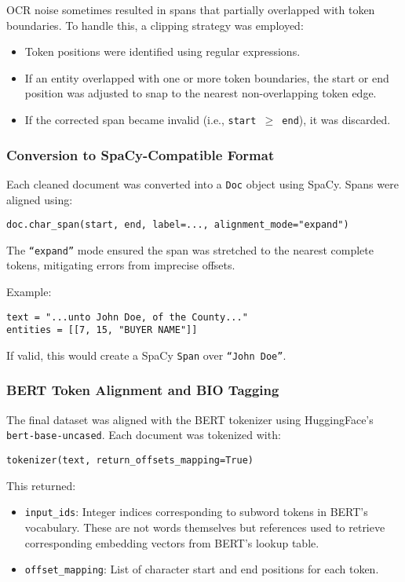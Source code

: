 \documentclass{article}
\begin{document}
OCR noise sometimes resulted in spans that partially overlapped with token boundaries. To handle this, a clipping strategy was employed:
\begin{itemize}
    \item Token positions were identified using regular expressions.
    \item If an entity overlapped with one or more token boundaries, the start or end position was adjusted to snap to the nearest non-overlapping token edge.
    \item If the corrected span became invalid (i.e., \texttt{start $\geq$ end}), it was discarded.
\end{itemize}

\subsubsection{Conversion to SpaCy-Compatible Format}

Each cleaned document was converted into a \texttt{Doc} object using SpaCy. Spans were aligned using:
\begin{verbatim}
doc.char_span(start, end, label=..., alignment_mode="expand")
\end{verbatim}

The \texttt{``expand''} mode ensured the span was stretched to the nearest complete tokens, mitigating errors from imprecise offsets.

Example:
\begin{verbatim}
text = "...unto John Doe, of the County..."
entities = [[7, 15, "BUYER NAME"]]
\end{verbatim}

If valid, this would create a SpaCy \texttt{Span} over \texttt{``John Doe''}.

\subsubsection{BERT Token Alignment and BIO Tagging}

The final dataset was aligned with the BERT tokenizer using HuggingFace’s \texttt{bert-base-uncased}. Each document was tokenized with:
\begin{verbatim}
tokenizer(text, return_offsets_mapping=True)
\end{verbatim}

This returned:
\begin{itemize}
    \item \texttt{input\_ids}: Integer indices corresponding to subword tokens in BERT’s vocabulary. These are not words themselves but references used to retrieve corresponding embedding vectors from BERT’s lookup table.
    \item \texttt{offset\_mapping}: List of character start and end positions for each token.
\end{itemize}
\end{document}
